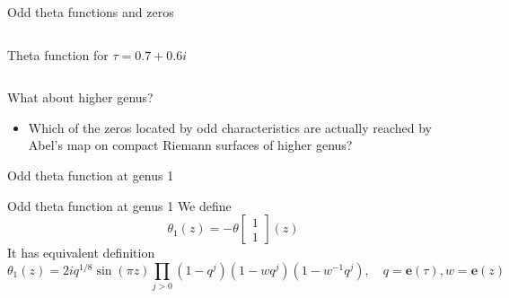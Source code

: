 \documentclass[11pt,aspectratio=169]{beamer}
\newcommand{\ee}[0]{\mathbf{e}}
\begin{document}
\begin{frame}{Odd theta functions and zeros}
\begin{columns}[onlytextwidth]
\begin{column}{0.45\textwidth}
            \tiny Theta function for $\tau = 0.7+0.6i$
            
            \cite{Cha22}
        \end{column}
    \end{columns}


    {
        \begin{block}{What about higher genus?}
            \begin{itemize}
                \item Which of the zeros located by odd characteristics are actually reached by Abel's map on compact Riemann surfaces of higher genus?
            \end{itemize}
        \end{block}
    }
\end{frame}

\begin{frame}{Odd theta function at genus 1}
    \begin{block}{Odd theta function at genus 1}
        We define
        \[\theta_1(z) = -\theta \begin{bmatrix} 1 \\ 1 \end{bmatrix}(z)\]
        It has equivalent definition
        \[\theta_1(z) = 2iq^{1/8} \sin(\pi z) \prod_{j>0} (1-q^j) (1-wq^j)(1-w^{-1}q^j) , \quad q=\ee(\tau),w=\ee(z)\]
    \end{block}
\end{frame}
\end{document}
